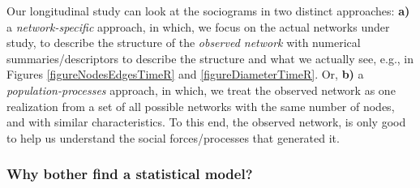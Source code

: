 \documentclass{acm_proc_article-sp}
\begin{document}
Our longitudinal study can look at the sociograms in two distinct approaches: \textbf{a)} a \textit{network-specific} approach, in which, we focus on the actual networks under study, to describe the structure of the \textit{observed network} with numerical summaries/descriptors to describe the structure and what we actually see, e.g., in Figures \ref{figureNodesEdgesTimeR} and \ref{figureDiameterTimeR}. Or, \textbf{b)} a \textit{population-processes} approach, in which, we treat the observed network as one realization from a set of all possible networks with the same number of nodes, and with similar characteristics. To this end, the observed network, is only good to help us understand the social forces/processes that generated it. 

\subsubsection{Why bother find a statistical model?}
\end{document}
